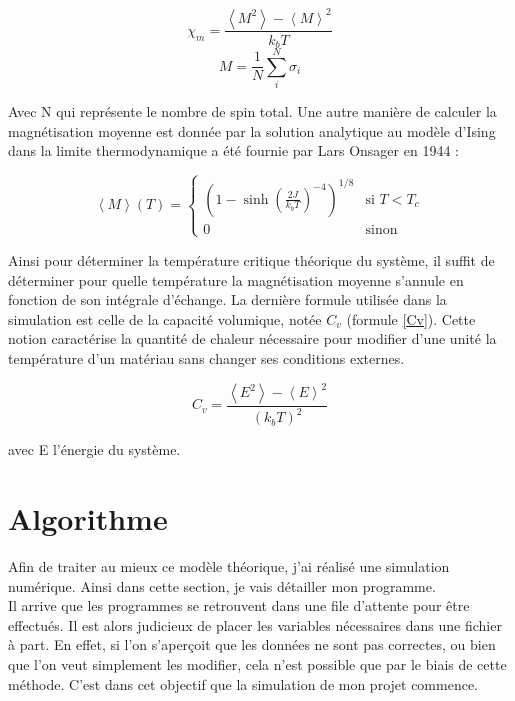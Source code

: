 \documentclass{article}
\begin{document}
\begin{multicols}{2}
\noindent 
\begin{equation}
    \chi_m = \frac{\left\langle M^2 \right\rangle-\left\langle M\right\rangle^2}{k_{b}T}
    \label{Xi}
\end{equation} 
\begin{equation}
   M=\frac{1}{N}\sum_{i}^{N}\sigma_{i}
   \label{Mag}
\end{equation} 
\end{multicols} 

Avec N qui représente le nombre de spin total. Une autre manière de calculer la magnétisation moyenne est donnée par la solution analytique au modèle d'Ising dans la limite thermodynamique a été fournie par Lars Onsager en 1944 : 

\begin{equation}
\left\langle M \right\rangle(T)= \left\{
\begin{array}{ll}
\left( 1-\sinh\left(\frac{2J}{k_{b}T}\right)^{-4} \right)^{1/8} & \mbox{si } T<T_{c} \\
0 & \mbox{sinon} 
\end{array}
\right.
\label{Magtheo}
\end{equation}

Ainsi pour déterminer la température critique théorique du système, il suffit de déterminer pour quelle température la magnétisation moyenne s'annule en fonction de son intégrale d'échange. La dernière formule utilisée dans la simulation est celle de la capacité volumique, notée $C_{v}$ (formule \ref{Cv}). Cette notion caractérise la quantité de chaleur nécessaire pour modifier d'une unité la température d'un matériau sans changer ses conditions externes. 

\begin{equation}
    C_{v} = \frac{\left\langle E^2 \right\rangle-\left\langle E\right\rangle^2}{(k_{b}T)^2}
    \label{Cv}
\end{equation} 

avec E l'énergie du système. 
\section{Algorithme}

Afin de traiter au mieux ce modèle théorique, j'ai réalisé une simulation numérique. Ainsi dans cette section, je vais détailler mon programme. \\

Il arrive que les programmes se retrouvent dans une file d'attente pour être effectués. Il est alors judicieux de placer les variables nécessaires dans une fichier à part. En effet, si l'on s'aperçoit que les données ne sont pas correctes, ou bien que l'on veut simplement les modifier, cela n'est possible que par le biais de cette méthode. C'est dans cet objectif que la simulation de mon projet commence. \\
\end{document}

